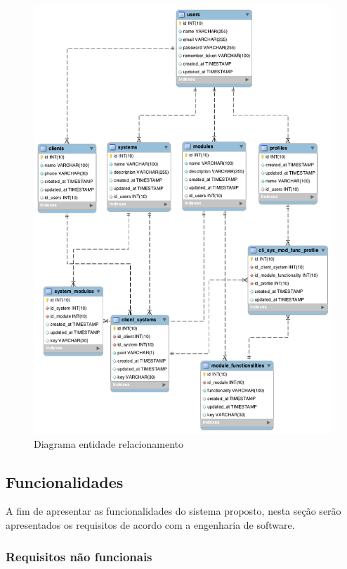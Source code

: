 \begin{figure}
	\label{fig:DER}
	\includegraphics[width=1\textwidth]{img/DER}
	\caption{Diagrama entidade relacionamento}
\end{figure}

\subsection{Funcionalidades}


A fim de apresentar as funcionalidades do sistema proposto, nesta seção serão apresentados os requisitos de acordo com a engenharia de software.


\subsubsection{Requisitos não funcionais}


